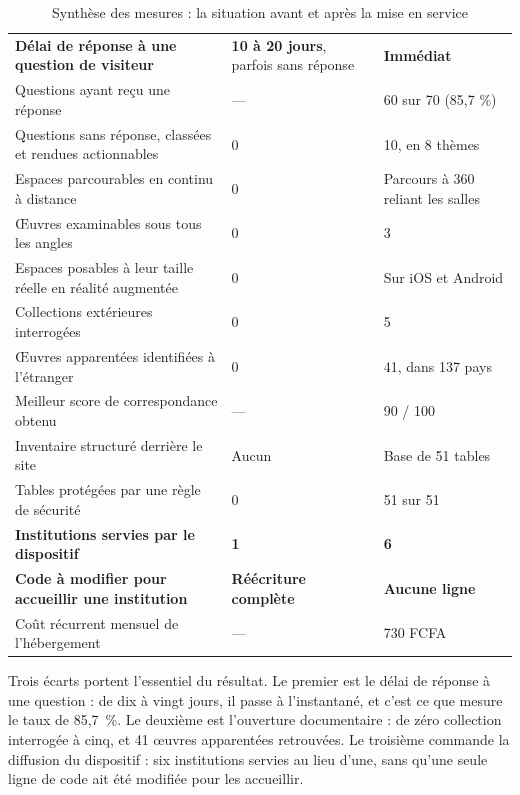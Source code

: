 \begin{table}[!ht]
\centering
\caption{Synthèse des mesures : la situation avant et après la mise en service}
\label{tab:mesures}
\small
\begin{tabularx}{\textwidth}{|X|C{3.4cm}|C{3.4cm}|}
\hline
{}
 &  &  \\ \hline
\textbf{Délai de réponse à une question de visiteur} & \textbf{10 à 20 jours}, parfois sans réponse & \textbf{Immédiat} \\ \hline
Questions ayant reçu une réponse & --- & 60 sur 70 (85,7 \%) \\ \hline
Questions sans réponse, classées et rendues actionnables & 0 & 10, en 8 thèmes \\ \hline
Espaces parcourables en continu à distance & 0 & Parcours à 360\textdegree{} reliant les salles \\ \hline
Œuvres examinables sous tous les angles & 0 & 3 \\ \hline
Espaces posables à leur taille réelle en réalité augmentée & 0 & Sur iOS et Android \\ \hline
Collections extérieures interrogées & 0 & 5 \\ \hline
Œuvres apparentées identifiées à l'étranger & 0 & 41, dans 137 pays \\ \hline
Meilleur score de correspondance obtenu & --- & 90 / 100 \\ \hline
Inventaire structuré derrière le site & Aucun & Base de 51 tables \\ \hline
Tables protégées par une règle de sécurité & 0 & 51 sur 51 \\ \hline
\textbf{Institutions servies par le dispositif} & \textbf{1} & \textbf{6} \\ \hline
\textbf{Code à modifier pour accueillir une institution} & \textbf{Réécriture complète} & \textbf{Aucune ligne} \\ \hline
Coût récurrent mensuel de l'hébergement & --- & 730 FCFA \\ \hline
\end{tabularx}
\end{table}

Trois écarts portent l'essentiel du résultat. Le premier est le délai de réponse
à une question : de dix à vingt jours, il passe à l'instantané, et c'est ce que
mesure le taux de 85,7~\%. Le deuxième est l'ouverture documentaire : de zéro
collection interrogée à cinq, et 41 œuvres apparentées retrouvées. Le troisième
commande la diffusion du dispositif : six institutions servies au lieu d'une,
sans qu'une seule ligne de code ait été modifiée pour les accueillir.

